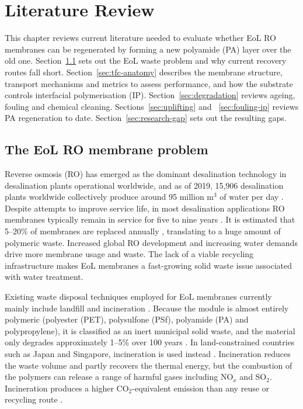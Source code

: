 \chapter{Literature Review}
\label{ch:literature_review}

This chapter reviews current literature needed to evaluate whether EoL RO membranes can be regenerated by forming a new polyamide (PA) layer over the old one. Section~\ref{sec:eol-problem} sets out the EoL waste problem and why current recovery routes fall short. Section~\ref{sec:tfc-anatomy} describes the membrane structure, transport mechanisms and metrics to assess performance, and how the substrate controls interfacial polymerisation (IP). Section~\ref{sec:degradation} reviews ageing, fouling and chemical cleaning. Sections~\ref{sec:uplifting} and ~\ref{sec:fouling-ip} reviews PA regeneration to date. Section~\ref{sec:research-gap} sets out the resulting gaps. 
 
\section{The EoL RO membrane problem}
\label{sec:eol-problem}
\label{sec:eol-routes}

Reverse osmosis (RO) has emerged as the dominant desalination technology in desalination plants operational worldwide, and as of 2019, 15,906 desalination plants worldwide collectively produce around 95 million $\mathrm{m^3}$ of water per day \citep{Jones2019}. Despite attempts to improve service life, in most desalination applications RO membranes typically remain in service for five to nine years \citep{Ding_2026, Lawler2015}. It is estimated that 5--20\% of membranes are replaced annually \citep{BerattoRamos2024, imdea2018transfomem, Guclu2022}, translating to a huge amount of polymeric waste. Increased global RO development and increasing water demands drive more membrane usage and waste. The lack of a viable recycling infrastructure makes EoL membranes a fast-growing solid waste issue associated with water treatment.

Existing waste disposal techniques employed for EoL membranes currently mainly include landfill and incineration \citep{Khanzada2024}. Because the module is almost entirely polymeric (polyester (PET), polysulfone (PSf), polyamide (PA) and polypropylene), it is classified as an inert municipal solid waste, and the material only degrades approximately 1--5\% over 100 years \citep{Lawler2015}. In land-constrained countries such as Japan and Singapore, incineration is used instead \citep{Lawler2015}. Incineration reduces the waste volume and partly recovers the thermal energy, but the combustion of the polymers can release a range of harmful gases including NO$_x$ and SO$_2$. Incineration produces a higher CO$_2$-equivalent emission than any reuse or recycling route \citep{Lawler2015}.

